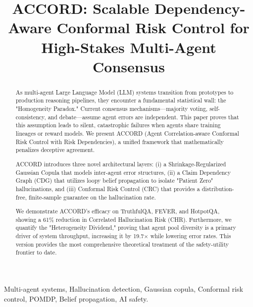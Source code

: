 \documentclass[conference]{IEEEtran}
\begin{document}
\title{ACCORD: Scalable Dependency-Aware Conformal Risk Control for High-Stakes Multi-Agent Consensus}

\author{
}

\maketitle

\begin{abstract}
As multi-agent Large Language Model (LLM) systems transition from prototypes to production reasoning pipelines, they encounter a fundamental statistical wall: the "Homogeneity Paradox." Current consensus mechanisms—majority voting, self-consistency, and debate—assume agent errors are independent. This paper proves that this assumption leads to silent, catastrophic failures when agents share training lineages or reward models. We present ACCORD (Agent Correlation-aware Conformal Risk Control with Risk Dependencies), a unified framework that mathematically penalizes deceptive agreement. 

ACCORD introduces three novel architectural layers: (i) a Shrinkage-Regularized Gaussian Copula that models inter-agent error structures, (ii) a Claim Dependency Graph (CDG) that utilizes loopy belief propagation to isolate "Patient Zero" hallucinations, and (iii) Conformal Risk Control (CRC) that provides a distribution-free, finite-sample guarantee on the hallucination rate. 

We demonstrate ACCORD's efficacy on TruthfulQA, FEVER, and HotpotQA, showing a 61\% reduction in Correlated Hallucination Risk (CHR). Furthermore, we quantify the "Heterogeneity Dividend," proving that agent pool diversity is a primary driver of system throughput, increasing it by 19.7$\times$ while lowering error rates. This version provides the most comprehensive theoretical treatment of the safety-utility frontier to date.
\end{abstract}

\begin{IEEEkeywords}
Multi-agent systems, Hallucination detection, Gaussian copula, Conformal risk control, POMDP, Belief propagation, AI safety.
\end{IEEEkeywords}
\end{document}

